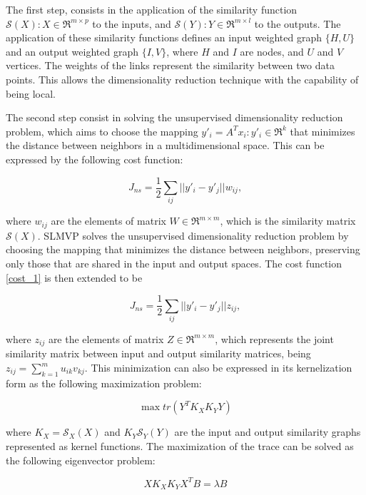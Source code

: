 The first step, consists in the application of the similarity function $\mathscr{S}(X) : X \in \mathfrak{R}^{m \times p}$ to the inputs, and $\mathscr{S}(Y) : Y \in \mathfrak{R}^{m \times l}$ to the outputs. The application of these similarity functions defines an input weighted graph $\{H, U\}$ and an output weighted graph $\{I, V\}$, where $H$ and $I$ are nodes, and $U$ and $V$ vertices. The weights of the links represent the similarity between two data points. This allows the dimensionality reduction technique with the capability of being local.

The second step consist in solving the unsupervised dimensionality reduction problem, which aims to choose the mapping $y'_i = A^T x_i : y'_i \in \mathfrak{R}^k$ that minimizes the distance between neighbors in a multidimensional space. This can be expressed by the following cost function:

\begin{equation}\label{cost_1}
    J_{ns} = \frac{1}{2} \sum_{ij} || y'_i - y'_j || w_{ij},
\end{equation}

where $w_{ij}$ are the elements of matrix $W \in \mathfrak{R}^{m \times m}$, which is the similarity matrix $\mathscr{S}(X)$.
SLMVP solves the unsupervised dimensionality reduction problem  by choosing the mapping that  minimizes the distance between neighbors, preserving only those that are shared in the input and output spaces. The cost function \ref{cost_1} is then extended to be

\begin{equation}
    J_{ns} = \frac{1}{2} \sum_{ij} || y'_i - y'_j || z_{ij},
\end{equation}

where $z_{ij}$ are the elements of matrix $Z \in \mathfrak{R}^{m \times m}$, which represents the joint similarity matrix between input and output similarity matrices, being $z_{ij} = \sum^m_{k=1} u_{ik}v_{kj}$. This minimization can also be expressed in its kernelization form as the following maximization problem:

\begin{equation}
    \max tr(Y^T K_X K_Y Y)
\end{equation}

where $K_X = \mathscr{S}_X(X)$ and $K_Y \mathscr{S}_Y(Y)$ are the input and output similarity graphs represented as kernel functions. The maximization of the trace can be solved as the following eigenvector problem:

\begin{equation}
    X K_X K_Y X^T B = \lambda B
\end{equation}

